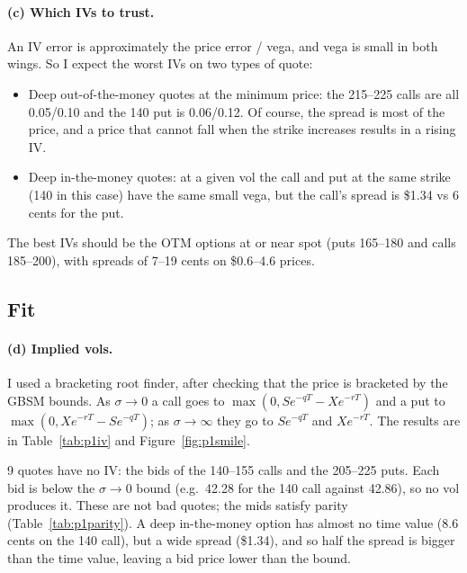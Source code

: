 \documentclass[11pt]{article}
\newcommand{\tbl}[1]{}
\begin{document}
\paragraph{(c) Which IVs to trust.} An IV error is approximately the price error / vega, and vega is small in both wings. So I expect the worst IVs on two types of quote:
\begin{itemize}\setlength\itemsep{0.1em}
\item Deep out-of-the-money quotes at the minimum price: the 215--225 calls are all 0.05/0.10 and the 140 put is 0.06/0.12. Of course, the spread is most of the price, and a price that cannot fall when the strike increases results in a rising IV.
\item Deep in-the-money quotes: at a given vol the call and put at the same strike (140 in this case) have the same small vega, but the call's spread is \$1.34 vs 6 cents for the put.
\end{itemize}
The best IVs should be the OTM options at or near spot (puts 165--180 and calls 185--200), with spreads of 7--19 cents on \$0.6--4.6 prices.

\subsection*{Fit}

\paragraph{(d) Implied vols.} I used a bracketing root finder, after checking that the price is bracketed by the GBSM bounds. As $\sigma\to0$ a call goes to $\max(0,Se^{-qT}-Xe^{-rT})$ and a put to $\max(0,Xe^{-rT}-Se^{-qT})$; as $\sigma\to\infty$ they go to $Se^{-qT}$ and $Xe^{-rT}$. The results are in Table~\ref{tab:p1iv} and Figure~\ref{fig:p1smile}.

9 quotes have no IV: the bids of the 140--155 calls and the 205--225 puts. Each bid is below the $\sigma\to0$ bound (e.g.\ 42.28 for the 140 call against 42.86), so no vol produces it. These are not bad quotes; the mids satisfy parity (Table~\ref{tab:p1parity}). A deep in-the-money option has almost no time value (8.6 cents on the 140 call), but a wide spread (\$1.34), and so half the spread is bigger than the time value, leaving a bid price lower than the bound.

\begin{table}[H]
\centering\footnotesize
\caption{Implied vol (\%) from bid, mid and ask; vega at the mid IV; IV change in vol points for a one cent price change ($100\times0.01/\text{vega}$). ``--'' = no implied vol.}
\label{tab:p1iv}
\tbl{p1_iv}
\end{table}
\end{document}
